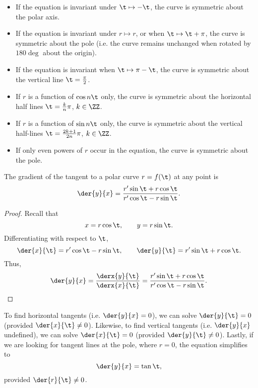 \begin{fact}
    \phantom{.}
    \begin{itemize}
        \item If the equation is invariant under $\t \mapsto -\t$, the curve is symmetric about the polar axis.
        \item If the equation is invariant under $r \mapsto r$, or when $\t \mapsto \t + \pi$, the curve is symmetric about the pole (i.e. the curve remains unchanged when rotated by $180\deg$ about the origin).
        \item If the equation is invariant when $\t \mapsto \pi - \t$, the curve is symmetric about the vertical line $\t = \frac\pi2$.
        \item If $r$ is a function of $\cos n\t$ only, the curve is symmetric about the horizontal half lines $\t = \frac{k}{n} \pi$, $k \in \ZZ$.
        \item If $r$ is a function of $\sin n\t$ only, the curve is symmetric about the vertical half-lines $\t = \frac{2k+1}{2n} \pi$, $k \in \ZZ$.
        \item If only even powers of $r$ occur in the equation, the curve is symmetric about the pole.
    \end{itemize}
\end{fact}

\begin{proposition}
    The gradient of the tangent to a polar curve $r = f(\t)$ at any point is \[\der{y}{x} = \frac{r' \sin \t + r \cos \t}{r' \cos \t - r \sin \t}.\]
\end{proposition}
\begin{proof}
    Recall that \[x = r\cos\t, \qquad y = r\sin\t.\] Differentiating with respect to $\t$, \[\der{x}{\t} = r' \cos \t - r\sin\t, \qquad \der{y}{\t} = r' \sin \t + r\cos\t.\] Thus, \[\der{y}{x} = \frac{\derx{y}{\t}}{\derx{x}{\t}} = \frac{r' \sin \t + r \cos \t}{r' \cos \t - r \sin \t}.\]
\end{proof}
\begin{remark}
    To find horizontal tangents (i.e. $\der{y}{x} = 0$), we can solve $\der{y}{\t} = 0$ (provided $\der{x}{\t} \neq 0$). Likewise, to find vertical tangents (i.e. $\der{y}{x}$ undefined), we can solve $\der{x}{\t} = 0$ (provided $\der{y}{\t} \neq 0$). Lastly, if we are looking for tangent lines at the pole, where $r = 0$, the equation simplifies to \[\der{y}{x} = \tan \t,\] provided $\der{r}{\t} \neq 0$.
\end{remark}